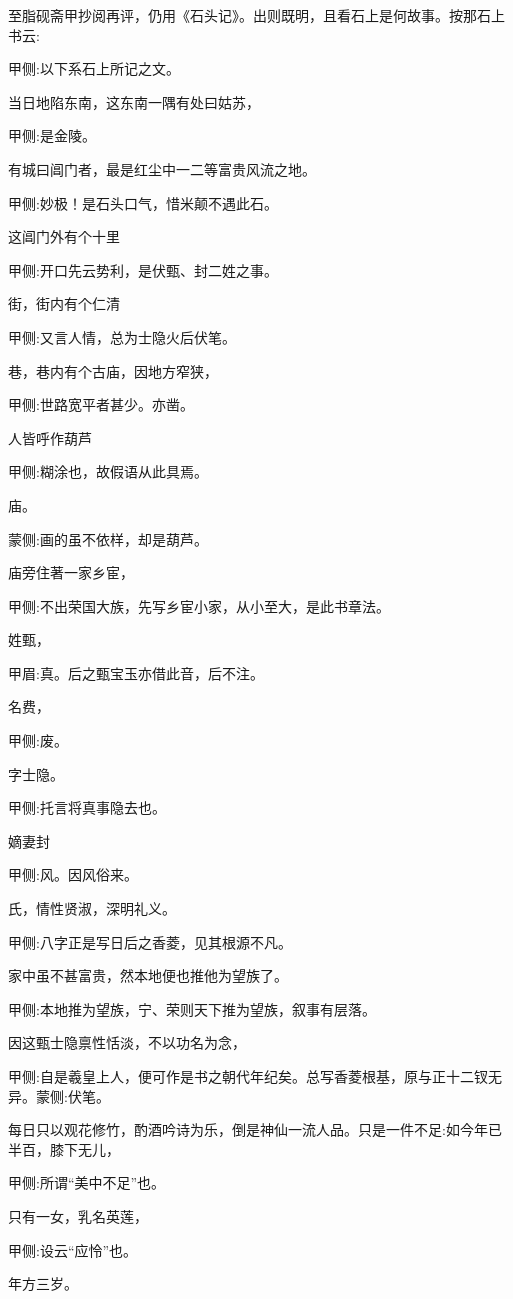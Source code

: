 \begin{parag}
    至脂砚斋甲抄阅再评，仍用《石头记》。出则既明，且看石上是何故事。按那石上书云:\begin{note}甲侧:以下系石上所记之文。\end{note}
\end{parag}


\begin{parag}
    当日地陷东南，这东南一隅有处曰姑苏，\begin{note}甲侧:是金陵。\end{note}有城曰阊门者，最是红尘中一二等富贵风流之地。\begin{note}甲侧:妙极！是石头口气，惜米颠不遇此石。\end{note}这阊门外有个十里\begin{note}甲侧:开口先云势利，是伏甄、封二姓之事。\end{note}街，街内有个仁清\begin{note}甲侧:又言人情，总为士隐火后伏笔。\end{note}巷，巷内有个古庙，因地方窄狭，\begin{note}甲侧:世路宽平者甚少。亦凿。\end{note}人皆呼作葫芦\begin{note}甲侧:糊涂也，故假语从此具焉。\end{note}庙。\begin{note}蒙侧:画的虽不依样，却是葫芦。\end{note}庙旁住著一家乡宦，\begin{note}甲侧:不出荣国大族，先写乡宦小家，从小至大，是此书章法。\end{note}姓甄，\begin{note}甲眉:真。后之甄宝玉亦借此音，后不注。\end{note}名费，\begin{note}甲侧:废。\end{note}字士隐。\begin{note}甲侧:托言将真事隐去也。\end{note}嫡妻封\begin{note}甲侧:风。因风俗来。\end{note}氏，情性贤淑，深明礼义。\begin{note}甲侧:八字正是写日后之香菱，见其根源不凡。\end{note}家中虽不甚富贵，然本地便也推他为望族了。\begin{note}甲侧:本地推为望族，宁、荣则天下推为望族，叙事有层落。\end{note}因这甄士隐禀性恬淡，不以功名为念，\begin{note}甲侧:自是羲皇上人，便可作是书之朝代年纪矣。总写香菱根基，原与正十二钗无异。蒙侧:伏笔。\end{note}每日只以观花修竹，酌酒吟诗为乐，倒是神仙一流人品。只是一件不足:如今年已半百，膝下无儿，\begin{note}甲侧:所谓“美中不足”也。\end{note}只有一女，乳名英莲，\begin{note}甲侧:设云“应怜”也。\end{note}年方三岁。
\end{parag}


